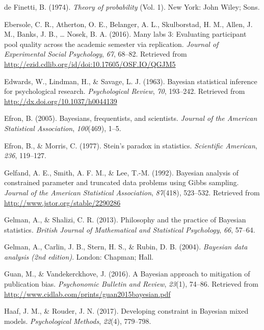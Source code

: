 \documentclass[english,man]{apa6}
\theoremstyle{definition}
\theoremstyle{definition}
\theoremstyle{remark}
\begin{document}
\hypertarget{ref-deFinetti:1974}{}
de Finetti, B. (1974). \emph{Theory of probability} (Vol. 1). New York:
John Wiley; Sons.

\hypertarget{ref-Ebersole:etal:2016}{}
Ebersole, C. R., Atherton, O. E., Belanger, A. L., Skulborstad, H. M.,
Allen, J. M., Banks, J. B., \ldots{} Nosek, B. A. (2016). Many labs 3:
Evaluating participant pool quality across the academic semester via
replication. \emph{Journal of Experimental Social Psychology},
\emph{67}, 68--82. Retrieved from
\url{http://ezid.cdlib.org/id/doi:10.17605/OSF.IO/QGJM5}

\hypertarget{ref-Edwards:etal:1963}{}
Edwards, W., Lindman, H., \& Savage, L. J. (1963). Bayesian statistical
inference for psychological research. \emph{Psychological Review},
\emph{70}, 193--242. Retrieved from
\url{http://dx.doi.org/10.1037/h0044139}

\hypertarget{ref-Efron:2005}{}
Efron, B. (2005). Bayesians, frequentists, and scientists. \emph{Journal
of the American Statistical Association}, \emph{100}(469), 1--5.

\hypertarget{ref-Efron:Morris:1977}{}
Efron, B., \& Morris, C. (1977). Stein's paradox in statistics.
\emph{Scientific American}, \emph{236}, 119--127.

\hypertarget{ref-Gelfand:etal:1992}{}
Gelfand, A. E., Smith, A. F. M., \& Lee, T.-M. (1992). Bayesian analysis
of constrained parameter and truncated data problems using Gibbs
sampling. \emph{Journal of the American Statistical Association},
\emph{87}(418), 523--532. Retrieved from
\url{http://www.jstor.org/stable/2290286}

\hypertarget{ref-Gelman:Shalizi:2013}{}
Gelman, A., \& Shalizi, C. R. (2013). Philosophy and the practice of
Bayesian statistics. \emph{British Journal of Mathematical and
Statistical Psychology}, \emph{66}, 57--64.

\hypertarget{ref-Gelman:etal:2004}{}
Gelman, A., Carlin, J. B., Stern, H. S., \& Rubin, D. B. (2004).
\emph{Bayesian data analysis (2nd edition)}. London: Chapman; Hall.

\hypertarget{ref-Guan:Vandekerckhove:2016}{}
Guan, M., \& Vandekerckhove, J. (2016). A Bayesian approach to
mitigation of publication bias. \emph{Psychonomic Bulletin and Review},
\emph{23}(1), 74--86. Retrieved from
\url{http://www.cidlab.com/prints/guan2015bayesian.pdf}

\hypertarget{ref-Haaf:Rouder:2017}{}
Haaf, J. M., \& Rouder, J. N. (2017). Developing constraint in Bayesian
mixed models. \emph{Psychological Methods}, \emph{22}(4), 779--798.
\end{document}

